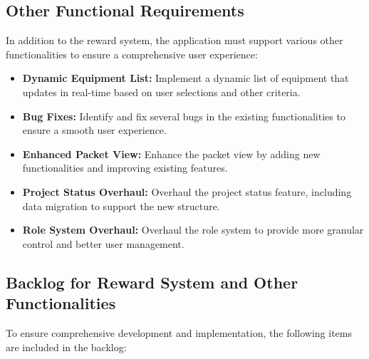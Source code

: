 \subsection{Other Functional Requirements}
In addition to the reward system, the application must support various other functionalities to ensure a comprehensive user experience:

\begin{itemize}
    \item \textbf{Dynamic Equipment List:} Implement a dynamic list of equipment that updates in real-time based on user selections and other criteria.
    \item \textbf{Bug Fixes:} Identify and fix several bugs in the existing functionalities to ensure a smooth user experience.
    \item \textbf{Enhanced Packet View:} Enhance the packet view by adding new functionalities and improving existing features.
    \item \textbf{Project Status Overhaul:} Overhaul the project status feature, including data migration to support the new structure.
    \item \textbf{Role System Overhaul:} Overhaul the role system to provide more granular control and better user management.
\end{itemize}

\subsection{Backlog for Reward System and Other Functionalities}
To ensure comprehensive development and implementation, the following items are included in the backlog:

